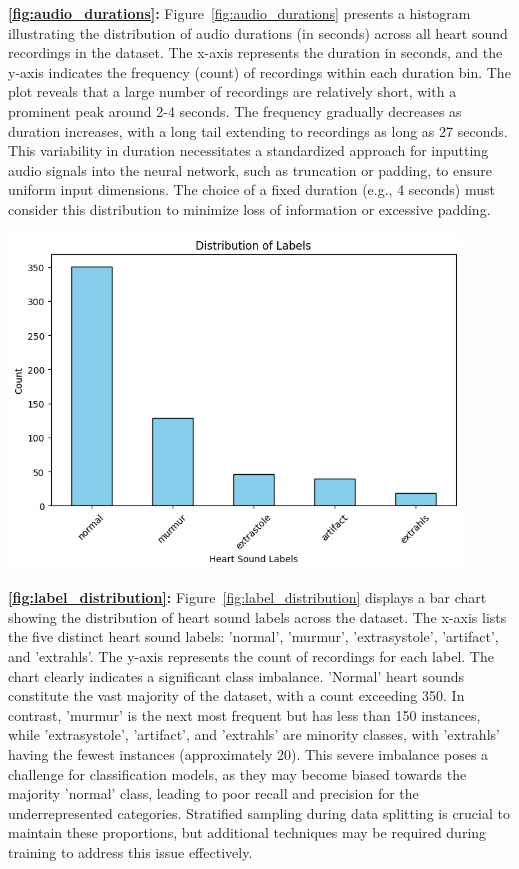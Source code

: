 \documentclass[a4paper]{article}
\begin{document}
\begin{multicols}{2}
\noindent \textbf{\ref{fig:audio_durations}:}
Figure~\ref{fig:audio_durations} presents a histogram illustrating the distribution of audio durations (in seconds) across all heart sound recordings in the dataset. The x-axis represents the duration in seconds, and the y-axis indicates the frequency (count) of recordings within each duration bin. The plot reveals that a large number of recordings are relatively short, with a prominent peak around 2-4 seconds. The frequency gradually decreases as duration increases, with a long tail extending to recordings as long as 27 seconds. This variability in duration necessitates a standardized approach for inputting audio signals into the neural network, such as truncation or padding, to ensure uniform input dimensions. The choice of a fixed duration (e.g., 4 seconds) must consider this distribution to minimize loss of information or excessive padding.

\vspace{1em}

\begin{minipage}{\columnwidth}
    \centering
    \includegraphics[width=0.9\textwidth]{output-4.png}
    \label{fig:label_distribution}
\end{minipage}

\noindent \textbf{\ref{fig:label_distribution}:}
Figure~\ref{fig:label_distribution} displays a bar chart showing the distribution of heart sound labels across the dataset. The x-axis lists the five distinct heart sound labels: 'normal', 'murmur', 'extrasystole', 'artifact', and 'extrahls'. The y-axis represents the count of recordings for each label. The chart clearly indicates a significant class imbalance. 'Normal' heart sounds constitute the vast majority of the dataset, with a count exceeding 350. In contrast, 'murmur' is the next most frequent but has less than 150 instances, while 'extrasystole', 'artifact', and 'extrahls' are minority classes, with 'extrahls' having the fewest instances (approximately 20). This severe imbalance poses a challenge for classification models, as they may become biased towards the majority 'normal' class, leading to poor recall and precision for the underrepresented categories. Stratified sampling during data splitting is crucial to maintain these proportions, but additional techniques may be required during training to address this issue effectively.


\end{multicols}
\end{document}
